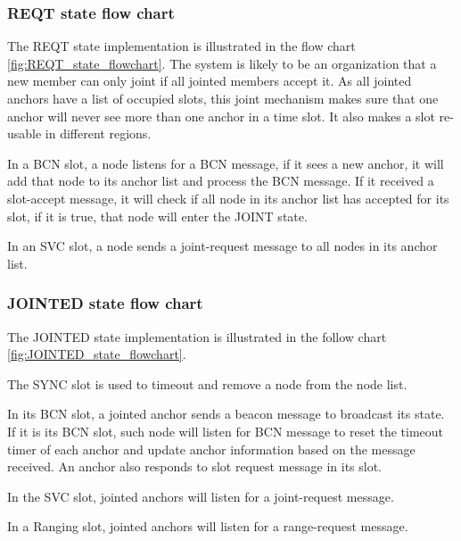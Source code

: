 \documentclass[\main/main.tex]{subfiles}
\begin{document}
\subsubsection{REQT state flow chart}
The REQT state implementation is illustrated in the flow chart \ref{fig:REQT_state_flowchart}. The system is likely to be an  organization that a new member can only joint if all jointed members accept it. As all jointed anchors have a list of occupied slots, this joint mechanism makes sure that one anchor will never see more than one anchor in a time slot. It also makes a slot re-usable in different regions.

In a BCN slot, a node listens for a BCN message, if it sees a new anchor, it will add that node to its anchor list and process the BCN message. If it received a slot-accept message, it will check if all node in its anchor list has accepted for its slot, if it is true, that node will enter the JOINT state.

In an SVC slot, a node sends a joint-request message to all nodes in its anchor list.


\subsubsection{JOINTED state flow chart}
The JOINTED state implementation is illustrated in the follow chart \ref{fig:JOINTED_state_flowchart}.

The SYNC slot is used to timeout and remove a node from the node list.

In its BCN slot, a jointed anchor sends a beacon message to broadcast its state. If it is its BCN slot, such node will listen for BCN message to reset the timeout timer of each anchor and update anchor information based on the message received. An anchor also responds to slot request message in its slot.

In the SVC slot, jointed anchors will listen for a joint-request message.

In a Ranging slot, jointed anchors will listen for a range-request message.
\end{document}
